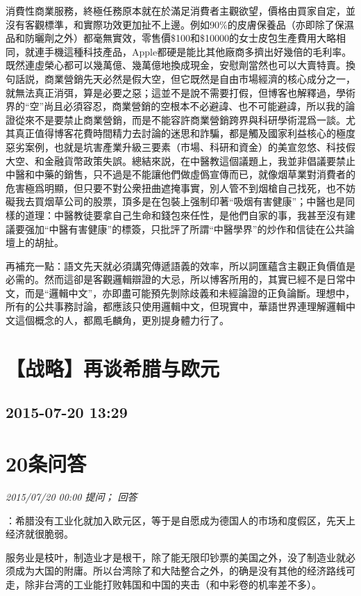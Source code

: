 \documentclass[twocolumn]{ctexart}
\begin{document}
消費性商業服務，終極任務原本就在於滿足消費者主觀欲望，價格由買家自定，並沒有客觀標準，和實際功效更加扯不上邊。例如90\%的皮膚保養品（亦即除了保濕品和防曬劑之外）都毫無實效，零售價\$100和\$10000的女士皮包生產費用大略相同，就連手機這種科技產品，Apple都硬是能比其他廠商多擠出好幾倍的毛利率。既然連虛榮心都可以幾萬億、幾萬億地換成現金，安慰劑當然也可以大賣特賣。換句話説，商業營銷先天必然是假大空，但它既然是自由市場經濟的核心成分之一，就無法真正消弭，算是必要之惡；這並不是說不需要打假，但博客也解釋過，學術界的“空”尚且必須容忍，商業營銷的空根本不必避諱、也不可能避諱，所以我的論證從來不是要禁止商業營銷，而是不能容許商業營銷跨界與科研學術混爲一談。尤其真正值得博客花費時間精力去討論的迷思和詐騙，都是觸及國家利益核心的極度惡劣案例，也就是坑害產業升級三要素（市場、科研和資金）的美宣忽悠、科技假大空、和金融貨幣政策失誤。總結來説，在中醫教這個議題上，我並非倡議要禁止中醫和中藥的銷售，只不過是不能讓他們做虛僞宣傳而已，就像烟草業對消費者的危害極爲明顯，但只要不對公衆扭曲遮掩事實，別人管不到烟槍自己找死，也不妨礙我去買烟草公司的股票，頂多是在包裝上强制印著“吸烟有害健康”；中醫也是同樣的道理：中醫教徒要拿自己生命和錢包來任性，是他們自家的事，我甚至沒有建議要强加“中醫有害健康”的標簽，只批評了所謂“中醫學界”的炒作和信徒在公共論壇上的胡扯。


再補充一點：語文先天就必須講究傳遞語義的效率，所以詞匯蘊含主觀正負價值是必需的。然而這卻是客觀邏輯辯證的大忌，所以博客所用的，其實已經不是日常中文，而是“邏輯中文”，亦即盡可能預先剝除歧義和未經論證的正負論斷。理想中，所有的公共事務討論，都應該只使用邏輯中文，但現實中，華語世界連理解邏輯中文這個概念的人，都鳳毛麟角，更別提身體力行了。
\\


\section{【战略】再谈希腊与欧元}
\subsection{2015-07-20 13:29}


\section{20条问答}

\textit{\hfill\noindent\small 2015/07/20 00:00 提问； 回答}

：希腊没有工业化就加入欧元区，等于是自愿成为德国人的市场和度假区，先天上经济就很脆弱。

服务业是枝叶，制造业才是根干，除了能无限印钞票的美国之外，没了制造业就必须成为大国的附庸。所以台湾除了和大陆整合之外，的确是没有其他的经济路线可走，除非台湾的工业能打败韩国和中国的夹击（和中彩卷的机率差不多）。\\
\end{document}
